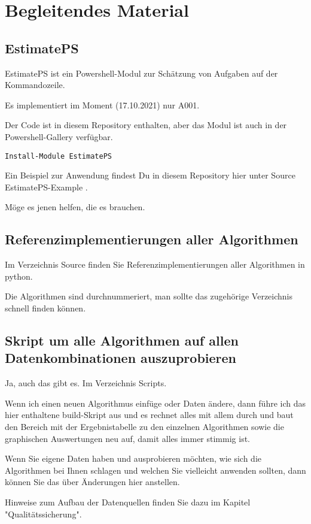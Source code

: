 \newpage{}

\section{Begleitendes Material}

\subsection{EstimatePS}

EstimatePS ist ein Powershell-Modul zur Schätzung von Aufgaben auf der Kommandozeile. 

Es implementiert im Moment (17.10.2021) nur A001.

Der Code ist in diesem Repository enthalten, aber das Modul ist auch in der Powershell-Gallery verfügbar.

\begin{verbatim}
Install-Module EstimatePS
\end{verbatim}

Ein Beispiel zur Anwendung findest Du in diesem Repository hier unter Source\\EstimatePS-Example .

Möge es jenen helfen, die es brauchen.

\subsection{Referenzimplementierungen aller Algorithmen}

Im Verzeichnis Source finden Sie Referenzimplementierungen aller Algorithmen in python. 

Die Algorithmen sind durchnummeriert, man sollte das zugehörige Verzeichnis schnell finden können.

\subsection{Skript um alle Algorithmen auf allen Datenkombinationen auszuprobieren}

Ja, auch das gibt es. Im Verzeichnis Scripts. 

Wenn ich einen neuen Algorithmus einfüge oder Daten ändere, dann führe ich das hier enthaltene build-Skript aus und es rechnet alles mit allem durch und baut den Bereich mit der Ergebnistabelle zu den einzelnen Algorithmen sowie die graphischen Auswertungen neu auf, damit alles immer stimmig ist.

Wenn Sie eigene Daten haben und ausprobieren möchten, wie sich die Algorithmen bei Ihnen schlagen und welchen Sie vielleicht anwenden sollten, dann können Sie das über Änderungen hier anstellen.

Hinweise zum Aufbau der Datenquellen finden Sie dazu im Kapitel "Qualitätssicherung".